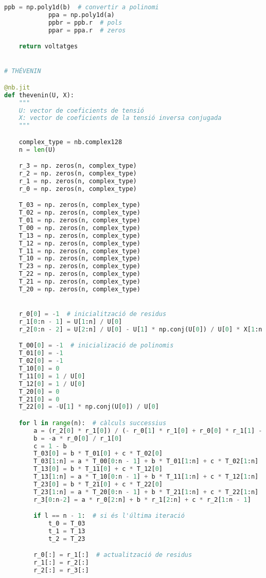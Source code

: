 \begin{lstlisting}[language=Python,numbers=none]
            ppb = np.poly1d(b)  # convertir a polinomi
            ppa = np.poly1d(a)
            ppbr = ppb.r  # pols
            ppar = ppa.r  # zeros

    return voltatges


# THÉVENIN   

@nb.jit
def thevenin(U, X):
    """
    U: vector de coeficients de tensió
    X: vector de coeficients de la tensió inversa conjugada
    """

    complex_type = nb.complex128
    n = len(U)

    r_3 = np. zeros(n, complex_type)
    r_2 = np. zeros(n, complex_type)
    r_1 = np. zeros(n, complex_type)
    r_0 = np. zeros(n, complex_type)

    T_03 = np. zeros(n, complex_type)
    T_02 = np. zeros(n, complex_type)
    T_01 = np. zeros(n, complex_type)
    T_00 = np. zeros(n, complex_type)
    T_13 = np. zeros(n, complex_type)
    T_12 = np. zeros(n, complex_type)
    T_11 = np. zeros(n, complex_type)
    T_10 = np. zeros(n, complex_type)
    T_23 = np. zeros(n, complex_type)
    T_22 = np. zeros(n, complex_type)
    T_21 = np. zeros(n, complex_type)
    T_20 = np. zeros(n, complex_type)


    r_0[0] = -1  # inicialització de residus
    r_1[0:n - 1] = U[1:n] / U[0]
    r_2[0:n - 2] = U[2:n] / U[0] - U[1] * np.conj(U[0]) / U[0] * X[1:n - 1]

    T_00[0] = -1  # inicializació de polinomis
    T_01[0] = -1
    T_02[0] = -1
    T_10[0] = 0
    T_11[0] = 1 / U[0]
    T_12[0] = 1 / U[0]
    T_20[0] = 0
    T_21[0] = 0
    T_22[0] = -U[1] * np.conj(U[0]) / U[0]

    for l in range(n):  # càlculs successius
        a = (r_2[0] * r_1[0]) / (- r_0[1] * r_1[0] + r_0[0] * r_1[1] - r_0[0] * r_2[0])
        b = -a * r_0[0] / r_1[0]
        c = 1 - b
        T_03[0] = b * T_01[0] + c * T_02[0]
        T_03[1:n] = a * T_00[0:n - 1] + b * T_01[1:n] + c * T_02[1:n]
        T_13[0] = b * T_11[0] + c * T_12[0]
        T_13[1:n] = a * T_10[0:n - 1] + b * T_11[1:n] + c * T_12[1:n]
        T_23[0] = b * T_21[0] + c * T_22[0]
        T_23[1:n] = a * T_20[0:n - 1] + b * T_21[1:n] + c * T_22[1:n]
        r_3[0:n-2] = a * r_0[2:n] + b * r_1[2:n] + c * r_2[1:n - 1]

        if l == n - 1:  # si és l'última iteració
            t_0 = T_03
            t_1 = T_13
            t_2 = T_23

        r_0[:] = r_1[:]  # actualització de residus
        r_1[:] = r_2[:]
        r_2[:] = r_3[:]


\end{lstlisting}

